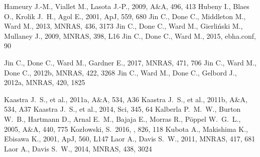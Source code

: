 \documentclass[a4paper,fleqn,usenatbib]{mnras}
\newcommand{\red}{\textcolor{red}}
\begin{document}
\begin{thebibliography}{99}
  Hameury J.-M., Viallet M., Lasota J.-P., 2009, A\&A, 496, 413 
 Hubeny I., Blaes O., Krolik J.~H., Agol E., 2001, ApJ, 559, 680 
 Jin C., Done C., Middleton M., Ward M., 2013, MNRAS, 436, 3173 
 Jin C., Done C., Ward M., Gierli{\'n}ski M., Mullaney J., 2009, MNRAS, 398, L16 
 Jin C., Done C., Ward M., 2015, ebha.conf, 90 

 Jin C., Done C., Ward M., Gardner E., 2017, MNRAS, 471, 706 
 Jin C., Ward M., Done C., 2012b, MNRAS, 422, 3268 
 Jin C., Ward M., Done C., Gelbord J., 2012a, MNRAS, 420, 1825 

 Kaastra J.~S., et al., 2011a, A\&A, 534, A36 
 Kaastra J.~S., et al., 2011b, A\&A, 534, A37 
 Kaastra J.~S., et al., 2014, Sci, 345, 64 
 Kalberla P.~M.~W., Burton W.~B., Hartmann D., Arnal E.~M., Bajaja E., Morras R., P{\"o}ppel W.~G.~L., 2005, A\&A, 440, 775 %
 Koz{\l}owski, S.\ 2016, \apj, 826, 118 
 Kubota A., Makishima K., Ebisawa K., 2001, ApJ, 560, L147 
 Laor A., Davis S.~W., 2011, MNRAS, 417, 681 
 Laor A., Davis S.~W., 2014, MNRAS, 438, 3024 


\end{thebibliography}
\end{document}
